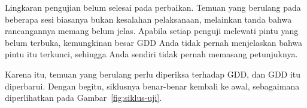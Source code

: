 Lingkaran pengujian belum selesai pada perbaikan. Temuan yang berulang pada
beberapa sesi  biasanya bukan kesalahan pelaksanaan,
melainkan tanda bahwa rancangannya memang belum jelas. Apabila setiap penguji
melewati pintu yang belum terbuka, kemungkinan besar GDD Anda tidak pernah
menjelaskan bahwa pintu itu terkunci, sehingga Anda sendiri tidak pernah
memasang petunjuknya.

Karena itu, temuan yang berulang perlu diperiksa terhadap GDD, dan GDD itu
diperbarui. Dengan begitu, siklusnya benar-benar kembali ke awal, sebagaimana
diperlihatkan pada Gambar~\ref{fig:siklus-uji}.
